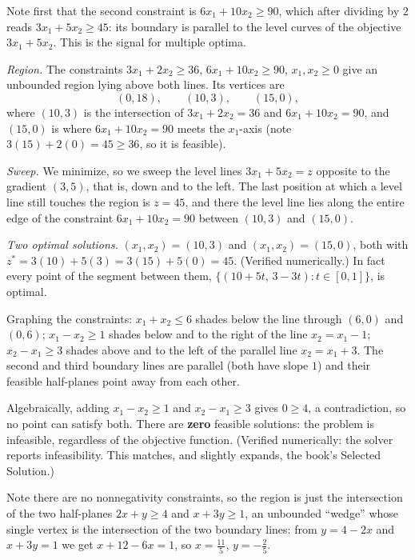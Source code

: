 Note first that the second constraint is $6x_1 + 10x_2 \geq 90$, which after dividing by $2$ reads $3x_1 + 5x_2 \geq 45$: its boundary is parallel to the level curves of the objective $3x_1 + 5x_2$. This is the signal for multiple optima.

\emph{Region.} The constraints $3x_1 + 2x_2 \geq 36$, $6x_1 + 10x_2 \geq 90$, $x_1, x_2 \geq 0$ give an unbounded region lying above both lines. Its vertices are
\[
(0,18), \qquad (10,3), \qquad (15,0),
\]
where $(10,3)$ is the intersection of $3x_1+2x_2=36$ and $6x_1+10x_2=90$, and $(15,0)$ is where $6x_1 + 10x_2 = 90$ meets the $x_1$-axis (note $3(15)+2(0) = 45 \geq 36$, so it is feasible).

\emph{Sweep.} We minimize, so we sweep the level lines $3x_1 + 5x_2 = z$ opposite to the gradient $(3,5)$, that is, down and to the left. The last position at which a level line still touches the region is $z = 45$, and there the level line lies along the entire edge of the constraint $6x_1 + 10x_2 = 90$ between $(10,3)$ and $(15,0)$.

\emph{Two optimal solutions.} $(x_1, x_2) = (10, 3)$ and $(x_1, x_2) = (15, 0)$, both with $z^* = 3(10) + 5(3) = 3(15) + 5(0) = 45$. (Verified numerically.) In fact every point of the segment between them, $\{(10 + 5t,\, 3 - 3t) : t \in [0,1]\}$, is optimal.

Graphing the constraints: $x_1 + x_2 \leq 6$ shades below the line through $(6,0)$ and $(0,6)$; $x_1 - x_2 \geq 1$ shades below and to the right of the line $x_2 = x_1 - 1$; $x_2 - x_1 \geq 3$ shades above and to the left of the parallel line $x_2 = x_1 + 3$. The second and third boundary lines are parallel (both have slope $1$) and their feasible half-planes point away from each other.

Algebraically, adding $x_1 - x_2 \geq 1$ and $x_2 - x_1 \geq 3$ gives $0 \geq 4$, a contradiction, so no point can satisfy both. There are \textbf{zero} feasible solutions: the problem is infeasible, regardless of the objective function. (Verified numerically: the solver reports infeasibility. This matches, and slightly expands, the book's Selected Solution.)

Note there are no nonnegativity constraints, so the region is just the intersection of the two half-planes $2x + y \geq 4$ and $x + 3y \geq 1$, an unbounded ``wedge'' whose single vertex is the intersection of the two boundary lines: from $y = 4 - 2x$ and $x + 3y = 1$ we get $x + 12 - 6x = 1$, so $x = \tfrac{11}{5}$, $y = -\tfrac{2}{5}$.

